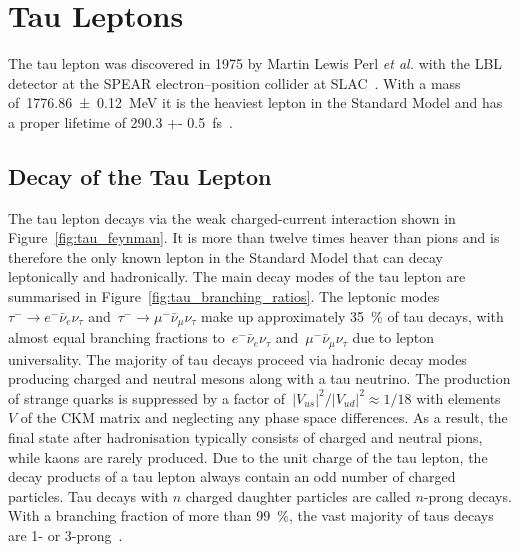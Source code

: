 \section{Tau Leptons}

The tau lepton was discovered in 1975 by Martin Lewis Perl \textit{et al.} with
the LBL detector at the SPEAR electron--position collider at SLAC~\cite{perl}.
With a mass of~\SI{1776.86 +- 0.12}{\MeV} it is the heaviest lepton in the
Standard Model and has a proper lifetime of \SI{290.3 +-
  0.5}{\femto\second}~\cite{pdg}.

\subsection{Decay of the Tau Lepton}

The tau lepton decays via the weak charged-current interaction shown in
Figure~\ref{fig:tau_feynman}. It is more than twelve times heaver than pions and
is therefore the only known lepton in the Standard Model that can decay
leptonically and hadronically. The main decay modes of the tau lepton are
summarised in Figure~\ref{fig:tau_branching_ratios}. The leptonic
modes~\mbox{$\tau^- \to e^- \bar{\nu}_e \nu_\tau$}
and~\mbox{$\tau^- \to \mu^- \bar{\nu}_\mu \nu_\tau$} make up approximately
\SI{35}{\percent} of tau decays, with almost equal branching fractions
to~$e^- \bar{\nu}_e \nu_\tau$ and~$\mu^- \bar{\nu}_\mu \nu_\tau$ due to lepton
universality. The majority of tau decays proceed via hadronic decay modes
producing charged and neutral mesons along with a tau neutrino. The production
of strange quarks is suppressed by a factor
of~$|V_{us}|^2 / |V_{ud}|^2 \approx 1/18$ with elements~$V$ of the CKM matrix
and neglecting any phase space differences. As a result, the final state after
hadronisation typically consists of charged and neutral pions, while kaons are
rarely produced. Due to the unit charge of the tau lepton, the decay products of
a tau lepton always contain an odd number of charged particles. Tau decays with
$n$ charged daughter particles are called $n$-prong decays. With a branching
fraction of more than \SI{99}{\percent}, the vast majority of taus decays are 1-
or 3-prong~\cite{pdg}.

